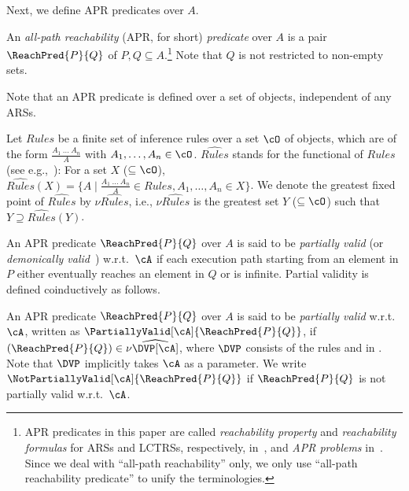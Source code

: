 Next, we define APR predicates over $A$.
\begin{definition}
	An \emph{all-path reachability} (APR, for short) \emph{predicate} over $A$ is a pair $\ReachPred{P}{Q}$ of $P,Q \subseteq A$.\footnote{APR predicates in this paper are called \emph{reachability property} and \emph{reachability formulas} for ARSs and LCTRSs, respectively, in~\cite{CL18}, and \emph{APR problems} in~\cite{KN23jlamp,KN23padl,KN24jip,Kojima24phd}.
		Since we deal with ``all-path reachability'' only, we only use ``all-path reachability predicate'' to unify the terminologies.}
	Note that $Q$ is not restricted to non-empty sets.
\end{definition}
Note that an APR predicate is defined over a set of objects, independent of any ARSs.

Let $\mathit{Rules}$ be a finite set of inference rules over a set $\cO$ of objects, which are of the form $\frac{A_1~\ldots~A_n}{A}$ with $A_1,\ldots,A_n \in \cO$.
$\widehat{\mathit{Rules}}$ stands for the functional of $\mathit{Rules}$ (see e.g.,~\cite[Appendix~A.2]{CL18corr}):
For a set $X$ ($\subseteq \cO$),
$\widehat{\mathit{Rules}}(X) = \{ A \mid \frac{A_1~\ldots~A_n}{A} \in \mathit{Rules},
	A_1,\ldots,A_n \in X \}$.
We denote the greatest fixed point of $\widehat{\mathit{Rules}}$ by $\nu\widehat{\mathit{Rules}}$, i.e., $\nu\widehat{\mathit{Rules}}$ is the greatest set $Y$ ($\subseteq \cO$) such that $Y \supseteq \widehat{\mathit{Rules}}(Y)$.

An APR predicate $\ReachPred{P}{Q}$ over $A$ is said to be \emph{partially valid} (or \emph{demonically valid}~\cite{CL18}) w.r.t.\ $\cA$ if each execution path starting from an element in $P$ either eventually reaches an element in $Q$ or is infinite.
Partial validity is defined coinductively as follows.
\begin{definition}
	\label{def:DVP}
	An APR predicate $\ReachPred{P}{Q}$ over $A$ is said to be \emph{partially valid} w.r.t.\ $\cA$, written as $\PartiallyValid[\cA]{\ReachPred{P}{Q}}$,
	if $(\ReachPred{P}{Q}) \in \nu\widehat{\DVP[\cA]}$, where $\DVP$ consists of
	the rules  and  in .
	Note that $\DVP$ implicitly takes $\cA$ as a parameter.
	We write $\NotPartiallyValid[\cA]{\ReachPred{P}{Q}}$ if $\ReachPred{P}{Q}$ is not partially valid w.r.t.\ $\cA$.
\end{definition}

